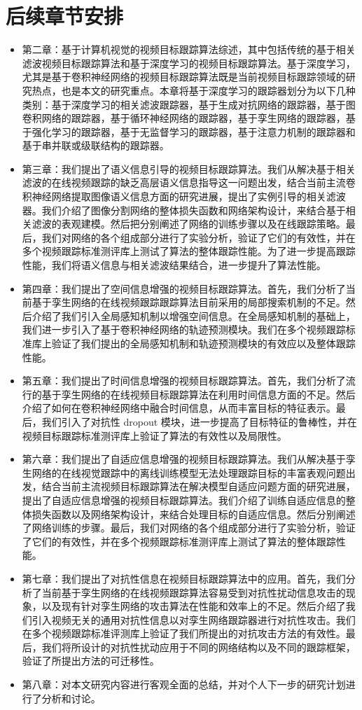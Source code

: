 \section{后续章节安排}
\begin{itemize}
\item 第二章：基于计算机视觉的视频目标跟踪算法综述，其中包括传统的基于相关滤波视频目标跟踪算法和基于深度学习的视频目标跟踪算法。基于深度学习，尤其是基于卷积神经网络的视频目标跟踪算法既是当前视频目标跟踪领域的研究热点，也是本文的研究重点。本章将基于深度学习的跟踪器划分为以下几种类别：基于深度学习的相关滤波跟踪器，基于生成对抗网络的跟踪器，基于图卷积网络的跟踪器，基于循环神经网络的跟踪器，基于孪生网络的跟踪器，基于强化学习的跟踪器，基于无监督学习的跟踪器，基于注意力机制的跟踪器和基于串并联或级联结构的跟踪器。
\item 第三章：我们提出了语义信息引导的视频目标跟踪算法。我们从解决基于相关滤波的在线视频跟踪的缺乏高层语义信息指导这一问题出发，结合当前主流卷积神经网络提取图像语义信息方面的研究进展，提出了实例引导的相关滤波器。我们介绍了图像分割网络的整体损失函数和网络架构设计，来结合基于相关滤波的表观建模。然后把分别阐述了网络的训练步骤以及在线跟踪策略。最后，我们对网络的各个组成部分进行了实验分析，验证了它们的有效性，并在多个视频跟踪标准测评库上测试了算法的整体跟踪性能。为了进一步提高跟踪性能，我们将语义信息与相关滤波结果结合，进一步提升了算法性能。
\item 第四章：我们提出了空间信息增强的视频目标跟踪算法。首先，我们分析了当前基于孪生网络的在线视频跟踪跟踪算法目前采用的局部搜索机制的不足。然后介绍了我们引入全局感知机制以增强空间信息。在全局感知机制的基础上，我们进一步引入了基于卷积神经网络的轨迹预测模块。我们在多个视频跟踪标准库上验证了我们提出的全局感知机制和轨迹预测模块的有效应以及整体跟踪性能。
\item 第五章：我们提出了时间信息增强的视频目标跟踪算法。首先，我们分析了流行的基于孪生网络的在线视频目标跟踪算法在利用时间信息方面的不足。然后介绍了如何在卷积神经网络中融合时间信息，从而丰富目标的特征表示。最后，我们引入了对抗性 dropout 模块，进一步提高了目标特征的鲁棒性，并在视频目标跟踪标准测评库上验证了算法的有效性以及局限性。
\item 第六章：我们提出了自适应信息增强的视频目标跟踪算法。我们从解决基于孪生网络的在线视觉跟踪中的离线训练模型无法处理跟踪目标的丰富表观问题出发，结合当前主流视频目标跟踪算法在解决模型自适应问题方面的研究进展，提出了自适应信息增强的视频目标跟踪算法。我们介绍了训练自适应信息的整体损失函数以及网络架构设计，来结合处理目标的自适应信息。然后分别阐述了网络训练的步骤。最后，我们对网络的各个组成部分进行了实验分析，验证了它们的有效性，并在多个视频跟踪标准测评库上测试了算法的整体跟踪性能。
\item 第七章：我们提出了对抗性信息在视频目标跟踪算法中的应用。首先，我们分析了当前基于孪生网络的在线视频跟踪算法容易受到对抗性扰动信息攻击的现象，以及现有针对孪生网络的攻击算法在性能和效率上的不足。然后介绍了我们引入视频无关的通用对抗性信息以对孪生网络跟踪器进行对抗性攻击。我们在多个视频跟踪标准评测库上验证了我们所提出的对抗攻击方法的有效性。最后，我们将所设计的对抗性扰动应用于不同的网络结构以及不同的跟踪框架，验证了所提出方法的可迁移性。
\item 第八章：对本文研究内容进行客观全面的总结，并对个人下一步的研究计划进行了分析和讨论。
\end{itemize}